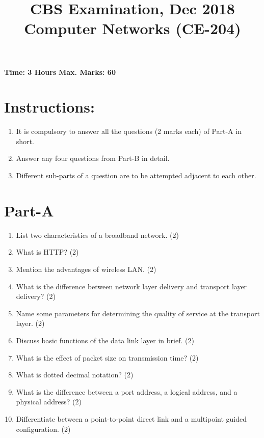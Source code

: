 \documentclass[a4paper,12pt]{article}
\title{\vspace{-2cm}CBS Examination, Dec 2018\\\textbf{Computer Networks (CE-204)}}
\author{}
\date{}
\begin{document}
\maketitle

\noindent \textbf{Time: 3 Hours} \hfill \textbf{Max. Marks: 60}

\section*{Instructions:}
\begin{enumerate}[label=\arabic*.]
    \item It is compulsory to answer all the questions (2 marks each) of Part-A in short.
    \item Answer any four questions from Part-B in detail.
    \item Different sub-parts of a question are to be attempted adjacent to each other.
\end{enumerate}

\section*{Part-A}

\begin{enumerate}[label=(\alph*)]
    \item List two characteristics of a broadband network. \hfill (2)
    \item What is HTTP? \hfill (2)
    \item Mention the advantages of wireless LAN. \hfill (2)
    \item What is the difference between network layer delivery and transport layer delivery? \hfill (2)
    \item Name some parameters for determining the quality of service at the transport layer. \hfill (2)
    \item Discuss basic functions of the data link layer in brief. \hfill (2)
    \item What is the effect of packet size on transmission time? \hfill (2)
    \item What is dotted decimal notation? \hfill (2)
    \item What is the difference between a port address, a logical address, and a physical address? \hfill (2)
    \item Differentiate between a point-to-point direct link and a multipoint guided configuration. \hfill (2)
\end{enumerate}
\end{document}
